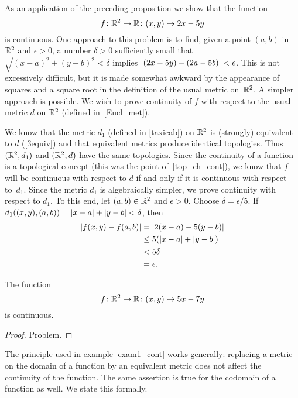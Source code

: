 \begin{exam}\label{exam1_cont} As an application of the preceding proposition we show that the
function
  \[ f\colon \mathbb{R}^2 \rightarrow \mathbb{R}\colon  (x,y) \mapsto 2x - 5y \]
is continuous. One approach to this problem is to find, given a point $(a,b)$ in $\mathbb{R}^2$
and $\epsilon > 0$, a number $\delta > 0$ sufficiently small that $\sqrt{(x - a)^2 + (y -
b)^2} < \delta$ implies $\lvert(2x - 5y) - (2a - 5b)\rvert < \epsilon$.  This is not
excessively difficult, but it is made somewhat awkward by the appearance of squares and a
square root in the definition of the usual metric on~$\mathbb{R}^2$.  A simpler approach is
possible.  We wish to prove continuity of $f$ with respect to the usual metric $d$ on
$\mathbb{R}^2$ (defined in~\ref{Eucl_met}).

We know that the metric $d_1$ (defined in \ref{taxicab}) on $\mathbb{R}^2$ is (strongly)
equivalent to $d$ (\ref{3equiv}) and that equivalent metrics produce identical
topologies. Thus $(\mathbb{R}^2, d_1)$ and $(\mathbb{R}^2, d)$ have the same topologies. Since the
continuity of a function is a topological concept (this was the point
of~\ref{top_ch_cont}), we know that $f$ will be continuous with respect to $d$ if and
only if it is continuous with respect to~$d_1$. Since the metric $d_1$ is algebraically
simpler, we prove continuity with respect to $d_1$.  To this end, let $(a,b) \in \mathbb{R}^2$
and $\epsilon > 0$.  Choose $\delta = \epsilon/5$.  If $d_1((x,y),(a,b)) = \lvert x - a\rvert +
\lvert y - b\rvert < \delta$, then
 \begin{align*}  \lvert f(x,y) - f(a,b)\rvert
                       &= \lvert2(x - a) - 5(y - b)\rvert \\
                       &\le 5(\lvert x - a\rvert + \lvert y - b\rvert) \\
                       &< 5\delta \\
                       &= \epsilon.
 \end{align*}
\end{exam}

\begin{exam} The function
  \[ f \colon \mathbb{R}^2 \rightarrow \mathbb{R} \colon  (x,y) \mapsto 5x - 7y \]
is continuous.
\end{exam}

\begin{proof} Problem.  \ns  \end{proof}


The principle used in example \ref{exam1_cont} works generally: replacing a metric on the
domain of a function by an equivalent metric does not affect the continuity of the function.
The same assertion is true for the codomain of a function as well.  We state this formally.

